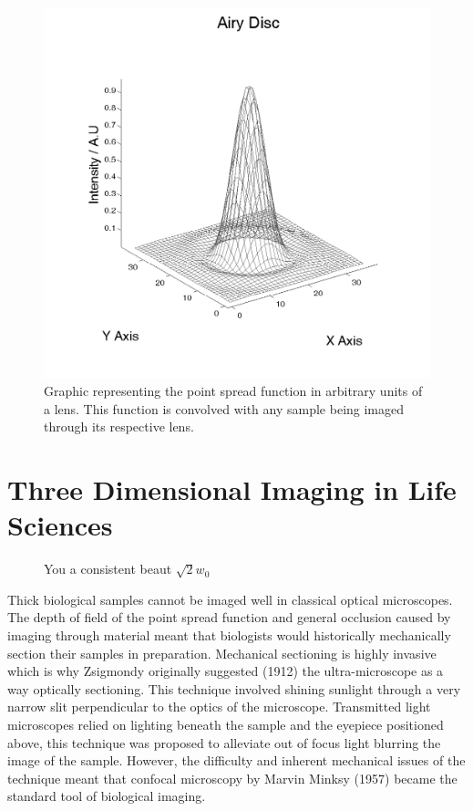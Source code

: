 \begin{figure}
	\centering
	\includegraphics[width=0.6\linewidth]{Airy_Disc}
	\caption[Airy Disc]{Graphic representing the point spread function in arbitrary units of a lens.
This function is convolved with any sample being imaged through its respective lens.}
	\label{fig:Airy_Disc}
\end{figure}


%

\section{Three Dimensional Imaging in Life Sciences}


  \begin{figure}
  \centering
  \def\svgwidth{0.6\textwidth}
  
  \caption{You a consistent beaut \(\sqrt2 w_0\)}
  \end{figure}


Thick biological samples cannot be imaged well in classical optical microscopes.
The depth of field of the point spread function and general occlusion caused by imaging through material meant that biologists would historically mechanically section their samples in preparation.
Mechanical sectioning is highly invasive which is why Zsigmondy originally suggested (1912) the ultra-microscope as a way optically sectioning\cite{Mappes2012}.
This technique involved shining sunlight through a very narrow slit perpendicular to the optics of the microscope.
Transmitted light microscopes relied on lighting beneath the sample and the eyepiece positioned above, this technique was proposed to alleviate out of focus light blurring the image of the sample.
However, the difficulty and inherent mechanical issues of the technique meant that confocal microscopy by Marvin Minksy (1957)\cite{Minsky1957} became the standard tool of biological imaging.

